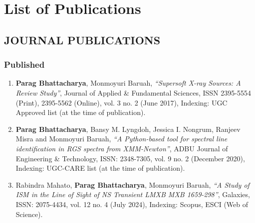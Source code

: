 \chapter{List of Publications} \label{appendix:publications}

    \section{\MakeUppercase{Journal Publications}}
    	\subsection{Published}
    		\begin{enumerate}
    			\item \textbf{Parag Bhattacharya}, Monmoyuri Baruah, \textit{``Supersoft X-ray Sources: A Review Study''}, Journal of Applied \& Fundamental Sciences, ISSN 2395-5554 (Print), 2395-5562 (Online), vol. 3 no. 2 (June 2017), Indexing: UGC Approved list (at the time of publication). \label{paper-jafs}
    			
    			\item \textbf{Parag Bhattacharya}, Bansy M. Lyngdoh, Jessica I. Nongrum, Ranjeev Misra and Monmoyuri Baruah, \textit{``A Python-based tool for spectral line identification in RGS spectra from XMM-Newton''}, ADBU Journal of Engineering \& Technology, ISSN: 2348-7305, vol. 9 no. 2 (December 2020), Indexing: UGC-CARE list (at the time of publication). \label{paper-ajet}
    			
    			\item Rabindra Mahato, \textbf{Parag Bhattacharya}, Monmoyuri Baruah, \textit{``A Study of ISM in the Line of Sight of NS Transient LMXB MXB 1659-298''}, Galaxies, ISSN: 2075-4434, vol. 12 no. 4 (July 2024), Indexing: Scopus, ESCI (Web of Science). \label{paper-galaxies}
    		\end{enumerate}
    	
    		
